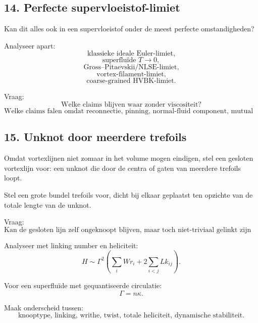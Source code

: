 \documentclass[11pt]{article}
\begin{document}
    \subsection{14. Perfecte supervloeistof-limiet}
        
        Kan dit alles ook in een supervloeistof onder de meest perfecte omstandigheden?
        
        Analyseer apart:
        \[
            \text{klassieke ideale Euler-limiet,}
        \]
        \[
            \text{superfluïde }T\rightarrow0,
        \]
        \[
            \text{Gross--Pitaevskii/NLSE-limiet,}
        \]
        \[
            \text{vortex-filament-limiet,}
        \]
        \[
            \text{coarse-grained HVBK-limiet.}
        \]
        
        Vraag:
        \[
            \text{Welke claims blijven waar zonder viscositeit?}
        \]
        \[
            \text{Welke claims falen omdat reconnectie, pinning, normal-fluid component, mutual friction, boundary forcing of quantisatie nodig is?}
        \]
    
    \subsection{15. Unknot door meerdere trefoils}
        
        Omdat vortexlijnen niet zomaar in het volume mogen eindigen, stel een gesloten vortexlijn voor: een unknot die door de centra of gaten van meerdere trefoils loopt.
        
        Stel een grote bundel trefoils voor, dicht bij elkaar geplaatst ten opzichte van de totale lengte van de unknot.
        
        Vraag:
        \[
            \text{Kan de gesloten lijn zelf ongeknoopt blijven, maar toch niet-triviaal gelinkt zijn met veel trefoils?}
        \]
        
        Analyseer met linking number en heliciteit:
        \[
            H
            \sim
            \Gamma^2
            \left(
                \sum_i Wr_i
            +
            2\sum_{i<j}Lk_{ij}
            \right).
        \]
        
        Voor een superfluïde met gequantiseerde circulatie:
        \[
            \Gamma=n\kappa.
        \]
        
        Maak onderscheid tussen:
        \[
            \text{knooptype, linking, writhe, twist, totale heliciteit, dynamische stabiliteit.}
        \]
    
\end{document}
